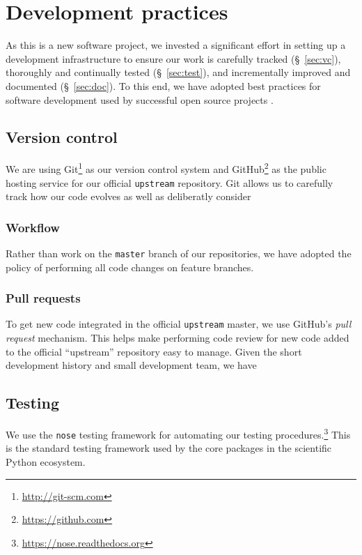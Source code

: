 \chapter{\label{ch:dev}Development practices}

As this is a new software project, we invested a significant effort in setting
up a development infrastructure to ensure our work is carefully tracked
(\S~\ref{sec:vc}), thoroughly and continually tested (\S~\ref{sec:test}), and
incrementally improved and documented (\S~\ref{sec:doc}).  To this end, we have
adopted best practices for software development used by successful open source
projects \cite{millman2014}.

\section{\label{sec:vc}Version control}

We are using Git\footnote{\url{http://git-scm.com}} as our version control
system and GitHub\footnote{\url{https://github.com}} as the public hosting
service for our official \texttt{upstream} repository.  Git allows us to
carefully track how our code evolves as well as deliberatly consider 

\subsection{Workflow}

Rather than work on the \texttt{master} branch of our repositories,
we have adopted the policy of performing all code changes on
feature branches.

\subsection{Pull requests}

To get new code integrated in the official \texttt{upstream} master, we use
GitHub's \emph{pull request} mechanism.  This helps make performing code review
for new code added to the official ``upstream'' repository easy to manage.
Given the short development history and small development team, we have 

\section{\label{sec:test}Testing}

We use the \texttt{nose} testing framework for automating our testing
procedures.\footnote{\url{https://nose.readthedocs.org}}  This is the standard
testing framework used by the core packages in the scientific Python ecosystem.

